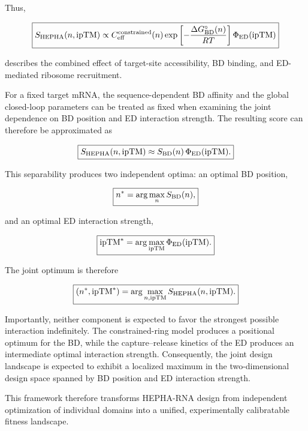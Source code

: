 \documentclass{article}
\begin{document}
Thus,

\[
\boxed{
S_{\rm HEPHA}(n,\mathrm{ipTM})
\propto
C_{\rm eff}^{\rm constrained}(n)
\exp\left[
-\frac{\Delta G_{\rm BD}^{\circ}(n)}
{RT}
\right]
\Phi_{\rm ED}(\mathrm{ipTM})
}
\]

describes the combined effect of target-site accessibility, BD binding, and ED-mediated ribosome recruitment.

For a fixed target mRNA, the sequence-dependent BD affinity and the global closed-loop parameters can be treated as fixed when examining the joint dependence on BD position and ED interaction strength. The resulting score can therefore be approximated as

\[
\boxed{
S_{\rm HEPHA}(n,\mathrm{ipTM})
\approx
S_{\rm BD}(n)\,
\Phi_{\rm ED}(\mathrm{ipTM}).
}
\]

This separability produces two independent optima: an optimal BD position,

\[
\boxed{
n^*
=
\arg\max_n S_{\rm BD}(n),
}
\]

and an optimal ED interaction strength,

\[
\boxed{
\mathrm{ipTM}^*
=
\arg\max_{\mathrm{ipTM}}
\Phi_{\rm ED}(\mathrm{ipTM}).
}
\]

The joint optimum is therefore

\[
\boxed{
(n^*,\mathrm{ipTM}^*)
=
\arg\max_{n,\mathrm{ipTM}}
S_{\rm HEPHA}(n,\mathrm{ipTM}).
}
\]

Importantly, neither component is expected to favor the strongest possible interaction indefinitely. The constrained-ring model produces a positional optimum for the BD, while the capture--release kinetics of the ED produces an intermediate optimal interaction strength. Consequently, the joint design landscape is expected to exhibit a localized maximum in the two-dimensional design space spanned by BD position and ED interaction strength.

This framework therefore transforms HEPHA-RNA design from independent optimization of individual domains into a unified, experimentally calibratable fitness landscape.
\end{document}
